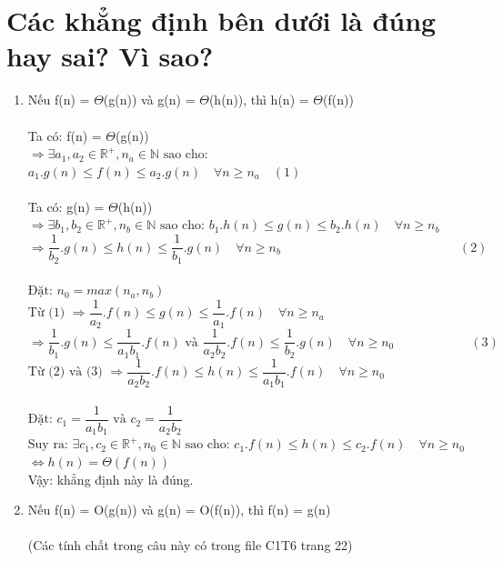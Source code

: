 \documentclass[12pt, letterpaper]{article}
\begin{document}
\section{Các khẳng định bên dưới là đúng hay sai? Vì sao?}
	\begin{enumerate}
		\item Nếu f(n) = $\Theta$(g(n)) và g(n) = $\Theta$(h(n)), thì h(n) = $\Theta$(f(n)) \\ \\
		Ta có: f(n) = $\Theta$(g(n)) \\
		$\Rightarrow \exists a_1, a_2 \in \mathbb{R^+}, n_a \in \mathbb{N} \text{ sao cho:}$ 
		$a_1.g(n) \leq f(n) \leq a_2.g(n) \quad \forall n \geq n_a \quad (1)$ \\ \\
		Ta có: g(n) = $\Theta$(h(n)) \\
		$\Rightarrow \exists b_1, b_2 \in \mathbb{R^+}, n_b \in \mathbb{N} \text{ sao cho:}$ 
		$b_1.h(n) \leq g(n) \leq b_2.h(n) \quad \forall n \geq n_b$ \\
		$\Rightarrow \dfrac{1}{b_2}.g(n) \leq h(n) \leq \dfrac{1}{b_1}.g(n) \quad\forall n \geq n_b \qquad\qquad\qquad\qquad\qquad\qquad\qquad (2)$ \\ \\
		$\text{Đặt: } n_0 = max(n_a, n_b)$ \\
		$\text{Từ (1) } \Rightarrow \dfrac{1}{a_2}.f(n) \leq g(n) \leq \dfrac{1}{a_1}.f(n) \quad\forall n \geq n_a$ \\
		$\Rightarrow \dfrac{1}{b_1}.g(n) \leq \dfrac{1}{a_1b_1}.f(n) \text{ và } \dfrac{1}{a_2b_2}.f(n) \leq \dfrac{1}{b_2}.g(n) \quad\forall n \geq n_0 \qquad\quad\quad\quad\quad (3)$ \\
		$\text{Từ (2) và (3) } \Rightarrow \dfrac{1}{a_2b_2}.f(n) \leq h(n) \leq \dfrac{1}{a_1b_1}.f(n) \quad\forall n \geq n_0$ \\ \\
		$\text{Đặt: } c_1 = \dfrac{1}{a_1b_1} \text{ và } c_2 = \dfrac{1}{a_2b_2}$ \\
		$\text{Suy ra: } \exists c_1, c_2 \in \mathbb{R^+}, n_0 \in \mathbb{N} \text{ sao cho:}$
		$c_1.f(n) \leq h(n) \leq c_2.f(n) \quad \forall n \geq n_0$ \\ 
		$\Leftrightarrow h(n) = \Theta(f(n))$ \\
		Vậy: khẳng định này là đúng.
		\item Nếu f(n) = O(g(n)) và g(n) = O(f(n)), thì f(n) = g(n) \\ \\
		(Các tính chất trong câu này có trong file C1T6 trang 22) \\

\end{enumerate}
\end{document}
